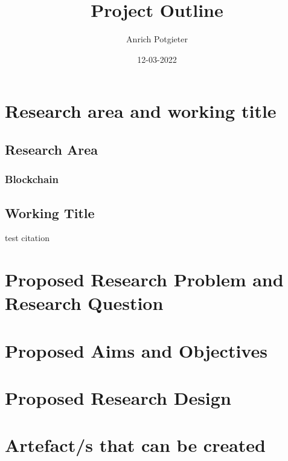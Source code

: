\documentclass[12pt]{article}
\title{Project Outline}
\author{Anrich Potgieter}
\date{12-03-2022}
\begin{document}
\maketitle
\section{Research area and working title}
\subsection{Research Area}
\subsubsection[short]{Blockchain}
\subsection{Working Title}
test citation \autocite{liuComparativeStudyBlockchainBased2019}
\section{Proposed Research Problem and Research Question}
\section{Proposed Aims and Objectives}
\section{Proposed Research Design}
\section{Artefact/s that can be created}
\printbibliography
\end{document}
